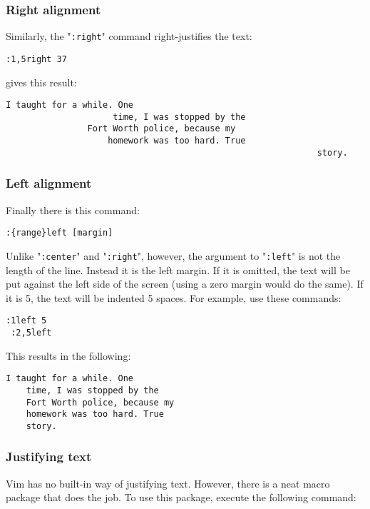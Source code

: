 \subsubsection{Right alignment}
Similarly, the "\verb!:right!" command right-justifies the text:

\begin{Verbatim}[samepage=true]
 :1,5right 37
\end{Verbatim}

gives this result:

\begin{Verbatim}[samepage=true]
						I taught for a while. One 
					 time, I was stopped by the 
				Fort Worth police, because my 
					homework was too hard. True 
															 story. 
\end{Verbatim}
\subsubsection{Left alignment}
Finally there is this command:

\begin{Verbatim}[samepage=true]
 :{range}left [margin]
\end{Verbatim}

Unlike "\verb!:center!" and "\verb!:right!", however, the argument to "\verb!:left!" is not the length of the line.
Instead it is the left margin.
If it is omitted, the text will be put against the left side of the screen (using a zero margin would do the same).
If it is 5, the text will be indented 5 spaces.
For example, use these commands:

\begin{Verbatim}[samepage=true]
 :1left 5
 :2,5left
\end{Verbatim}

This results in the following:

\begin{Verbatim}[samepage=true]
         I taught for a while. One 
    time, I was stopped by the 
    Fort Worth police, because my 
    homework was too hard. True 
    story. 
\end{Verbatim}

\subsubsection{Justifying text}
Vim has no built-in way of justifying text.
However, there is a neat macro package that does the job.
To use this package, execute the following command:

